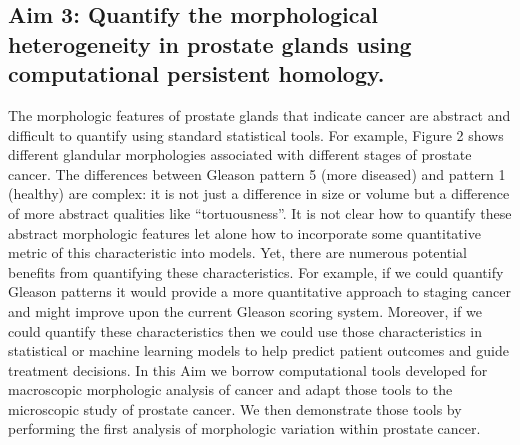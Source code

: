 \documentclass{NIHGrant}
\theoremstyle{theorem}
\begin{document}
\subsection*{Aim 3: Quantify the morphological heterogeneity in prostate glands using computational persistent homology.}
The morphologic features of prostate glands that indicate cancer are abstract and difficult to quantify using standard statistical tools. For example, Figure 2 shows different glandular morphologies associated with different stages of prostate cancer. The differences between Gleason pattern 5 (more diseased) and pattern 1 (healthy) are complex: it is not just a difference in size or volume but a difference of more abstract qualities like ``tortuousness''. It is not clear how to quantify these abstract morphologic features let alone how to incorporate some quantitative metric of this characteristic into models. Yet, there are numerous potential benefits from quantifying these characteristics. For example, if we could quantify Gleason patterns it would provide a more quantitative approach to staging cancer and might improve upon the current Gleason scoring system. Moreover, if we could quantify these characteristics then we could use those characteristics in statistical or machine learning models to help predict patient outcomes and guide treatment decisions. In this Aim we borrow computational tools developed for macroscopic morphologic analysis of cancer and adapt those tools to the microscopic study of prostate cancer. We then demonstrate those tools by performing the first analysis of morphologic variation within prostate cancer.
\end{document}
